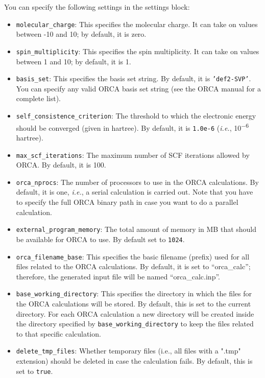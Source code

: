 \documentclass[]{tufte-book}
\begin{document}
You can specify the following settings in the settings block:
\begin{itemize}
\item \texttt{molecular\_charge}: This specifies the molecular charge. It can take on values between -10 and 10; by default,
it is zero.
\item \texttt{spin\_multiplicity}: This specifies the spin multiplicity. It can take on values between 1 and 10; by default,
it is 1.
\item \texttt{basis\_set}: This specifies the basis set string. By default, it is \texttt{'def2-SVP'}. You can specify
any valid ORCA basis set string (see the ORCA manual for a complete list).
\item \texttt{self\_consistence\_criterion}: The threshold to which the electronic energy should be converged (given in
hartree). By default, it is \texttt{1.0e-6} (\textit{i.e.}, 10\textsuperscript{$-$6}\,hartree).
\item \texttt{max\_scf\_iterations}: The maximum number of SCF iterations allowed by ORCA. By default, it is 100.
\item \texttt{orca\_nprocs}: The number of processors to use in the ORCA calculations. By default, it is one, \textit{i.e.},
a serial calculation is carried out. Note that you have to specify the full ORCA binary path in case you want to do a
parallel calculation.
\item \texttt{external\_program\_memory}: The total amount of memory in MB that should be available for ORCA to use.
By default set to \texttt{1024}.
\item \texttt{orca\_filename\_base}: This specifies the basic filename (prefix) used for all files related to the ORCA calculations.
By default, it is set to ``orca\_calc''; therefore, the generated input file will be named ``orca\_calc.inp''.
\item \texttt{base\_working\_directory}: This specifies the directory in which the files for the ORCA calculations will
be stored. By default, this is set to the current directory. For each ORCA calculation a new directory will be
created inside the directory specified by \texttt{base\_working\_directory} to keep the files related to that specific
calculation.
\item \texttt{delete\_tmp\_files}: Whether temporary files (i.e., all files with a ".tmp" extension) should be deleted in case 
the calculation fails. By default, this is set to \texttt{true}.
\end{itemize}
\end{document}
